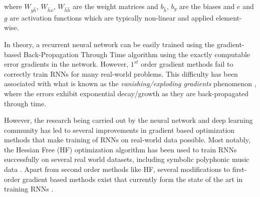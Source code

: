 	where $W_{y\hat{h}}$, $W_{\hat{h}x}$, $W_{\hat{h}\hat{h}}$ are the weight matrices and $b_{\hat{h}}$, $b_y$ are the biases and $e$ and $g$ are activation functions which are typically non-linear and applied element-wise. %
	
	In theory, a recurrent neural network can be easily trained using the gradient-based Back-Propagation Through Time algorithm \cite{Werbos1990} using the exactly computable error gradients in the network. However, $1^{st}$ order gradient methods fail to correctly train RNNs for many real-world problems. This difficulty has been associated with what is known as the \textit{vanishing/exploding gradients} phenomenon \cite{Bengio1994}, where the errors exhibit exponential decay/growth as they are back-propagated through time. %

	However, the research being carried out by the neural network and deep learning community has led to several improvements in gradient based optimization methods that make training of RNNs on real-world data possible. Most notably, the Hessian Free (HF) optimization algorithm has been used to train RNNs successfully on several real world datasets, including symbolic polyphonic music data \cite{Martens2011}. Apart from second order methods like HF, several modifications to first-order gradient based methods exist that currently form the state of the art in training RNNs \cite{bengio2012advances}. 
%


